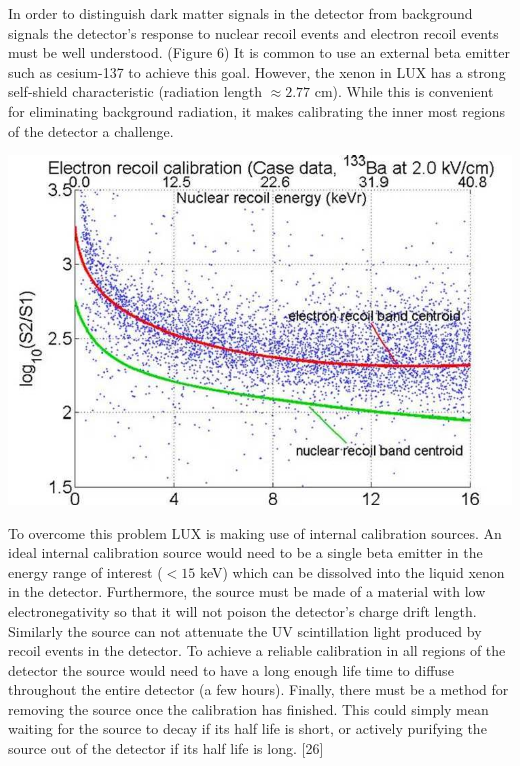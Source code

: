 \documentclass[a4paper,12pt]{article}
\begin{document}
In order to distinguish dark matter signals in the detector from background signals the detector's response to nuclear recoil events and electron recoil events must be well understood. (Figure 6) It is common to use an external beta emitter such as cesium-137 to achieve this goal.  However, the xenon in LUX has a strong self-shield characteristic (radiation length $ \approx 2.77 $ cm).  While this is convenient for eliminating background radiation, it makes calibrating the inner most regions of the detector a challenge.

\begin{center}
\includegraphics[scale=0.75]{Recoils.jpg}
\end{center}

To overcome this problem LUX is making use of internal calibration sources.  An ideal internal calibration source would need to be a single beta emitter in the energy range of interest ($ <15 $ keV) which can be dissolved into the liquid xenon in the detector.  Furthermore, the source must be made of a material with low electronegativity so that it will not poison the detector's charge drift length.  Similarly the source can not attenuate the UV scintillation light produced by recoil events in the detector.  To achieve a reliable calibration in all regions of the detector the source would need to have a long enough life time to diffuse throughout the entire detector (a few hours).  Finally, there must be a method for removing the source once the calibration has finished.  This could simply mean waiting for the source to decay if its half life is short, or actively purifying the source out of the detector if its half life is long. [26]
\end{document}
